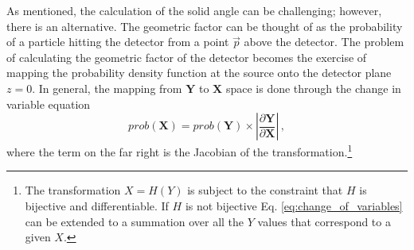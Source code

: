 As mentioned, the calculation of the solid angle can be challenging; however, there is an alternative.
The geometric factor can be thought of as the probability of a particle hitting the detector from a point $\vec{p}$ above the detector. The problem of calculating the geometric factor of the detector becomes the exercise of mapping the probability density function at the source onto the detector plane $z=0$. In general, the mapping from $\mathbf{Y}$ to $\mathbf{X}$ space is done through the change in variable equation 
\begin{equation}
\label{eq:change_of_variables}
prob(\mathbf{X}) = prob(\mathbf{Y}) \times \left | \frac{\partial \mathbf{Y}}{\partial \mathbf{X}} \right|\,,
\end{equation}
where the term on the far right is the Jacobian of the transformation.\footnote{The transformation $X = H(Y)$ is subject to the constraint that $H$ is bijective and differentiable. If $H$ is not bijective Eq. \ref {eq:change_of_variables} can be extended to a summation over all the $Y$ values that correspond to a given $X$.}


